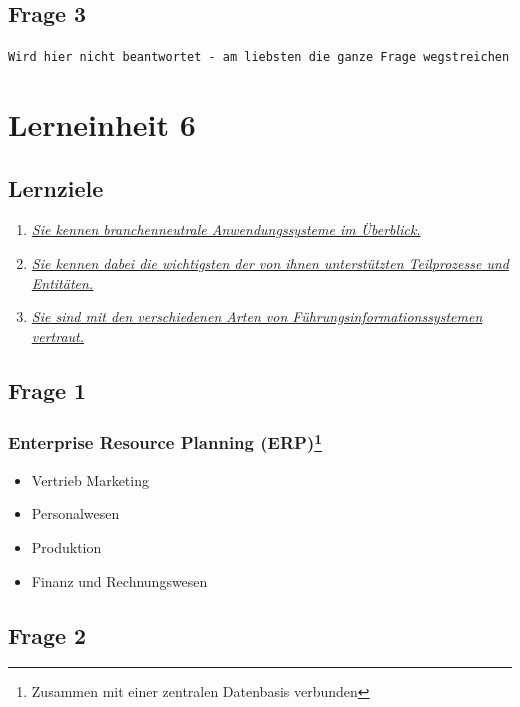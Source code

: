 \documentclass[a4paper]{article}
\begin{document}
			
			
			\subsection{Frage 3}
			\label{le5-3}
			\texttt{Wird hier nicht beantwortet - am liebsten die ganze Frage wegstreichen}
			
			\pagebreak
			
			\section{Lerneinheit 6}
			\subsection{Lernziele}
			\begin{enumerate}
				\item \hyperref[le6-1]{\textit{Sie kennen branchenneutrale Anwendungssysteme im Überblick.}}
				\item \hyperref[le6-2]{\textit{Sie kennen dabei die wichtigsten der von ihnen unterstützten Teilprozesse und Entitäten.}}
				\item \hyperref[le6-3]{\textit{Sie sind mit den verschiedenen Arten von Führungsinformationssystemen vertraut.}}
			\end{enumerate}
			
			\subsection{Frage 1}
			\subsubsection{Enterprise Resource Planning (ERP)\footnote{Zusammen mit einer zentralen Datenbasis verbunden}}
			\begin{itemize}
				\item Vertrieb Marketing
				\item Personalwesen
				\item Produktion
				\item Finanz und Rechnungswesen
			\end{itemize}
			
			\subsection{Frage 2}
\end{document}
